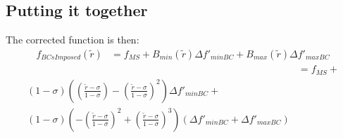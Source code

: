 \subsection{Putting it together}

The corrected function is then: 
\begin{align*}
    f_{BCsImposed} \left( \widetilde{r} \right) &= 
    f_{MS} + 
    B_{min}\left( \widetilde{r} \right) \Delta f'_{minBC} +
    B_{max}\left( \widetilde{r} \right) \Delta f'_{maxBC}
\end{align*}
\begin{align*}
    &= 
    f_{MS} + \\
    \left( 1 - \sigma \right) \left( 
        \left( \frac{\widetilde{r} - \sigma}{1 - \sigma} \right) 
        - \left( \frac{\widetilde{r} - \sigma}{1 - \sigma} \right) ^2
\right) \Delta f'_{minBC} + \\
\left( 1 - \sigma \right) \left( - \left( \frac{\widetilde{r} - \sigma}{1 - \sigma} \right)^2 + 
    \left( \frac{\widetilde{r} - \sigma}{1 - \sigma}  \right)^3
\right)
\left( \Delta f'_{minBC} + \Delta f'_{maxBC} \right) 
\end{align*}
